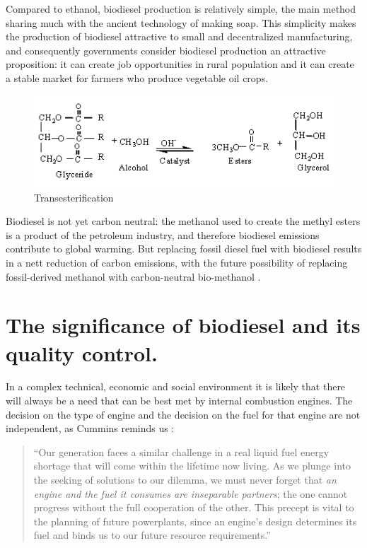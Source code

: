 Compared to ethanol, biodiesel production is relatively simple, the main method
sharing much with the ancient technology of making soap. This simplicity makes
the production of biodiesel attractive to small and decentralized manufacturing,
and consequently governments consider biodiesel production an attractive
proposition: it can create job opportunities in rural population and it can
create a stable market for farmers who produce vegetable oil crops.

\begin{figure}
	\centering
	\includegraphics[width=\textwidth]{Figures/reaction}
	\decoRule
	\caption[Transesterification]{Transesterification}
	\label{fig:Electron}
\end{figure}

Biodiesel is not yet carbon neutral: the methanol used to create the methyl
esters is a product of the petroleum industry, and therefore biodiesel emissions
contribute to global warming. But replacing fossil diesel fuel with biodiesel
results in a nett reduction of carbon emissions, with the future possibility of
replacing fossil-derived methanol with carbon-neutral bio-methanol
\autocite{Shamsul2014}.

\section{The significance of biodiesel and its quality control.}

In a complex technical, economic and social environment it is likely that there
will always be a need that can be best met by internal combustion engines. The
decision on the type of engine and the decision on the fuel for that engine are
not independent, as Cummins reminds us \autocite{Cummins1989}:

\begin{quotation}
``Our generation faces a similar challenge in a real liquid fuel energy shortage
that will come within the lifetime now living. As we plunge into the seeking of
solutions to our dilemma, we must never forget that \textit{an engine and the
fuel it consumes are inseparable partners}; the one cannot progress without the
full cooperation of the other. This precept is vital to the planning of future
powerplants, since an engine's design determines its fuel and binds us to our
future resource requirements.''
\end{quotation}

